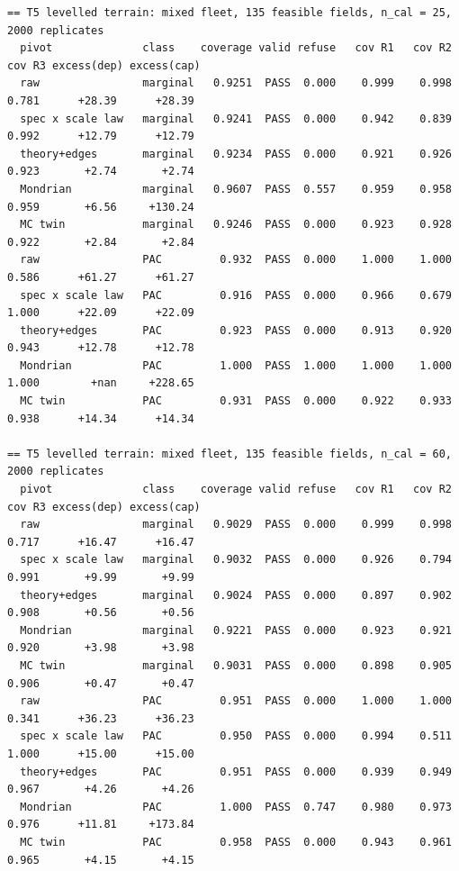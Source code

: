 \documentclass[preprint,12pt,authoryear]{elsarticle}
\begin{document}
\begin{Verbatim}[fontsize=\tiny,breaklines]
== T5 levelled terrain: mixed fleet, 135 feasible fields, n_cal = 25, 2000 replicates
  pivot              class    coverage valid refuse   cov R1   cov R2   cov R3 excess(dep) excess(cap)
  raw                marginal   0.9251  PASS  0.000    0.999    0.998    0.781      +28.39      +28.39
  spec x scale law   marginal   0.9241  PASS  0.000    0.942    0.839    0.992      +12.79      +12.79
  theory+edges       marginal   0.9234  PASS  0.000    0.921    0.926    0.923       +2.74       +2.74
  Mondrian           marginal   0.9607  PASS  0.557    0.959    0.958    0.959       +6.56     +130.24
  MC twin            marginal   0.9246  PASS  0.000    0.923    0.928    0.922       +2.84       +2.84
  raw                PAC         0.932  PASS  0.000    1.000    1.000    0.586      +61.27      +61.27
  spec x scale law   PAC         0.916  PASS  0.000    0.966    0.679    1.000      +22.09      +22.09
  theory+edges       PAC         0.923  PASS  0.000    0.913    0.920    0.943      +12.78      +12.78
  Mondrian           PAC         1.000  PASS  1.000    1.000    1.000    1.000        +nan     +228.65
  MC twin            PAC         0.931  PASS  0.000    0.922    0.933    0.938      +14.34      +14.34

== T5 levelled terrain: mixed fleet, 135 feasible fields, n_cal = 60, 2000 replicates
  pivot              class    coverage valid refuse   cov R1   cov R2   cov R3 excess(dep) excess(cap)
  raw                marginal   0.9029  PASS  0.000    0.999    0.998    0.717      +16.47      +16.47
  spec x scale law   marginal   0.9032  PASS  0.000    0.926    0.794    0.991       +9.99       +9.99
  theory+edges       marginal   0.9024  PASS  0.000    0.897    0.902    0.908       +0.56       +0.56
  Mondrian           marginal   0.9221  PASS  0.000    0.923    0.921    0.920       +3.98       +3.98
  MC twin            marginal   0.9031  PASS  0.000    0.898    0.905    0.906       +0.47       +0.47
  raw                PAC         0.951  PASS  0.000    1.000    1.000    0.341      +36.23      +36.23
  spec x scale law   PAC         0.950  PASS  0.000    0.994    0.511    1.000      +15.00      +15.00
  theory+edges       PAC         0.951  PASS  0.000    0.939    0.949    0.967       +4.26       +4.26
  Mondrian           PAC         1.000  PASS  0.747    0.980    0.973    0.976      +11.81     +173.84
  MC twin            PAC         0.958  PASS  0.000    0.943    0.961    0.965       +4.15       +4.15


\end{Verbatim}
\end{document}
